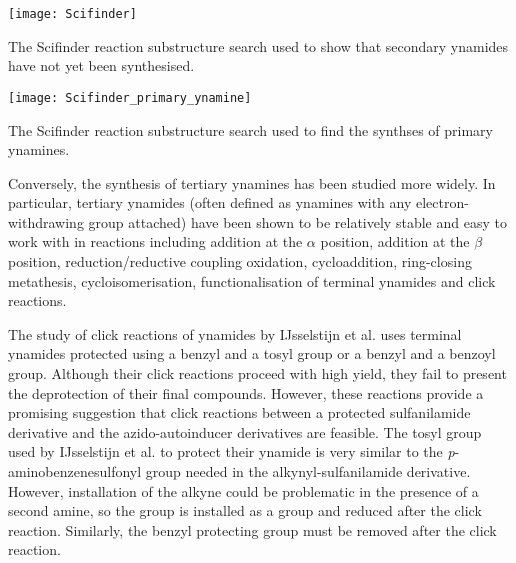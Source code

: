 \begin{scheme}[H]
	\begin{center}
		\texttt{[image: Scifinder]}
		\caption{The Scifinder reaction substructure search used to show that secondary ynamides have not yet been synthesised\cite{ScifinderSecondaryYnamide}.
		\label{fig:Scifinder}}
	\end{center}
\end{scheme}

\begin{scheme}[H]
	\begin{center}
		\texttt{[image: Scifinder\_primary\_ynamine]}
		\caption{The Scifinder reaction substructure search used to find the synthses of primary ynamines\cite{ScifinderPrimaryYnamine}.
		\label{fig:Scifinder_primary_ynamine}}
	\end{center}
\end{scheme}


Conversely, the synthesis of tertiary ynamines has been studied more widely\cite{Ficini1976}. In particular, tertiary ynamides (often defined as ynamines with any electron-withdrawing group attached) have been shown to be relatively stable and easy to work with in reactions including 
addition at the $\alpha$ position, 
addition at the $\beta$ position, 
reduction/reductive coupling
oxidation,
cycloaddition, 
ring-closing metathesis,
cycloisomerisation,
functionalisation of terminal ynamides and click reactions\cite{IJsselstijn2006,Evano2010}. 

The study of click reactions of ynamides by IJsselstijn et al. uses terminal ynamides protected using a benzyl and a tosyl group or a benzyl and a benzoyl group. Although their click reactions proceed with high yield, they fail to present the deprotection of their final compounds. However, these reactions provide a promising suggestion that click reactions between a protected sulfanilamide derivative and the azido-autoinducer derivatives are feasible. The tosyl group used by IJsselstijn et al. to protect their ynamide is very similar to the \textit{p}-aminobenzenesulfonyl group needed in the alkynyl-sulfanilamide derivative. However, installation of the alkyne could be problematic in the presence of a second amine, so the  group is installed as a  group and reduced after the click reaction.  Similarly, the benzyl protecting group must be removed after the click reaction.




